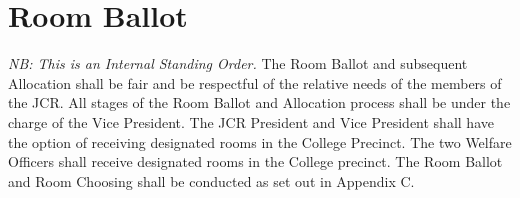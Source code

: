 \chapter{Room Ballot}
\hspace*{-10pt}\textit{NB: This is an Internal Standing Order.}
\npara The Room Ballot and subsequent Allocation shall be fair and be respectful of the relative needs of the members of the JCR.
\npara All stages of the Room Ballot and Allocation process shall be under the charge of the Vice President.
\npara The JCR President and Vice President shall have the option of receiving designated rooms in the College Precinct. The two Welfare Officers shall receive designated rooms in the College precinct.
\npara The Room Ballot and Room Choosing shall be conducted as set out in Appendix C.
